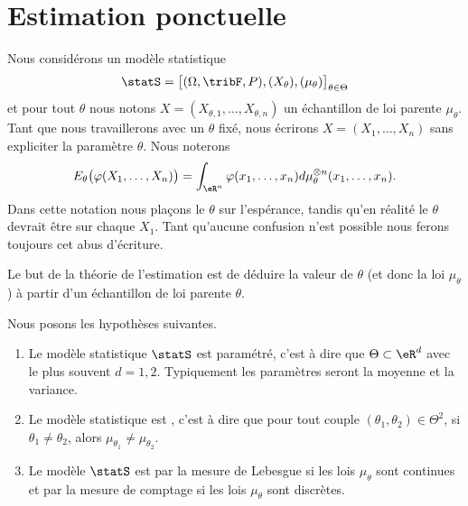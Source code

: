\section{Estimation ponctuelle}

Nous considérons un modèle statistique 
\begin{equation}
    \statS=\big[ (\Omega,\tribF,P),(X_{\theta}),(\mu_{\theta}) \big]_{\theta\in\Theta}
\end{equation}
et pour tout \( \theta\) nous notons \( X=(X_{\theta,1},\ldots,X_{\theta,n})\) un échantillon de loi parente \( \mu_{\theta}\). Tant que nous travaillerons avec un \( \theta\) fixé, nous écrirons \( X=(X_1,\ldots,X_n)\) sans expliciter la paramètre \( \theta\). Nous noterons 
\begin{equation}        \label{EqFbKGZD}
    E_{\theta}\big( \varphi(X_1,\ldots,X_n) \big)=\int_{\eR^n}\varphi(x_1,\ldots,x_n)d\mu_{\theta}^{\otimes n}(x_1,\ldots,x_n).
\end{equation}
Dans cette notation nous plaçons le \( \theta\) sur l'espérance, tandis qu'en réalité le \( \theta\) devrait être sur chaque \( X_1\). Tant qu'aucune confusion n'est possible nous ferons toujours cet abus d'écriture.

Le but de la théorie de l'estimation est de déduire la valeur de \( \theta\) (et donc la loi \( \mu_{\theta}\)) à partir d'un échantillon de loi parente \( \theta\). 

Nous posons les hypothèses suivantes.
\begin{enumerate}
    \item
        Le modèle statistique \( \statS\) est paramétré, c'est à dire que \( \Theta\subset\eR^d\) avec le plus souvent \( d=1,2\). Typiquement les paramètres seront la moyenne et la variance.
    \item
        Le modèle statistique est , c'est à dire que pour tout couple \( (\theta_1,\theta_2)\in\Theta^2\), si \( \theta_1\neq\theta_2\), alors \( \mu_{\theta_1}\neq\mu_{\theta_2}\).
    \item
        Le modèle \( \statS\) est  par la mesure de Lebesgue si les lois \( \mu_{\theta}\) sont continues et par la mesure de comptage si les lois \( \mu_{\theta}\) sont discrètes.
\end{enumerate}

